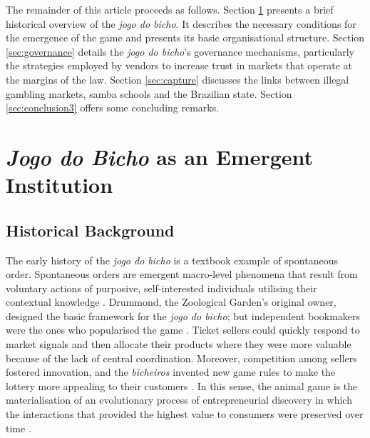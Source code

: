 \documentclass[a4paper,12pt]{article}
\begin{document}
The remainder of this article proceeds as follows. Section \ref{sec:institution} presents a brief historical overview of the \emph{jogo do bicho}. It describes the necessary conditions for the emergence of the game and presents its basic organisational structure. Section \ref{sec:governance} details the \emph{jogo do bicho}'s governance mechanisms, particularly the strategies employed by vendors to increase trust in markets that operate at the margins of the law. Section \ref{sec:capture} discusses the links between illegal gambling markets, samba schools and the Brazilian state. Section \ref{sec:conclusion3} offers some concluding remarks.

\section{\emph{Jogo do Bicho} as an Emergent Institution}
\label{sec:institution}

\subsection{Historical Background}
\label{sub:background}

The early history of the \emph{jogo do bicho} is a textbook example of spontaneous order. Spontaneous orders are emergent macro-level phenomena that result from voluntary actions of purposive, self-interested individuals utilising their contextual knowledge \citep{boettke1990theory, boettke2005methodological, hayek1945use, hayek1960constitution, hayek1973law, leeson2008coordination, menger1871grundsatze, polanyi1948planning, polanyi1951logic}. Drummond, the Zoological Garden's original owner, designed the basic framework for the \emph{jogo do bicho}; but independent bookmakers were the ones who popularised the game \citep[77]{magalhaes2005ganhou}. Ticket sellers could quickly respond to market signals and then allocate their products where they were more valuable because of the lack of central coordination. Moreover, competition among sellers fostered innovation, and the \emph{bicheiros} invented new game rules to make the lottery more appealing to their customers \citep[61]{mello1989historia}. In this sense, the animal game is the materialisation of an evolutionary process of entrepreneurial discovery in which the interactions that provided the highest value to consumers were preserved over time \citep{boettke2008gordon, boettke2014entrepreneurship, buchanan1964should, hayek1978competition, kirzner1997entrepreneurial}.
\end{document}
